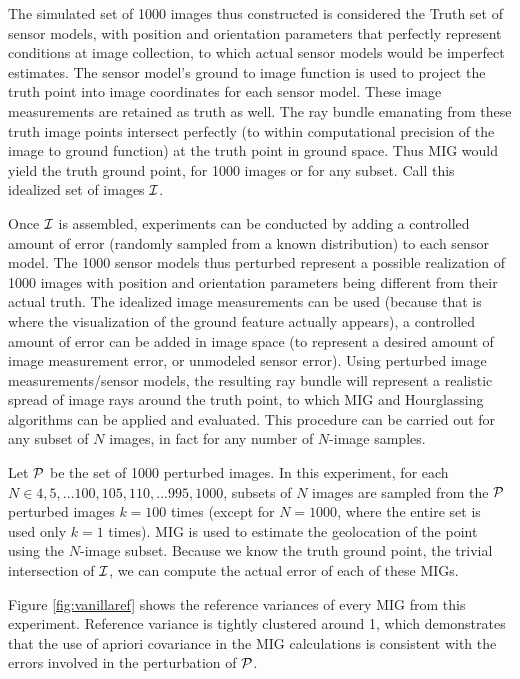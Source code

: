 \documentclass{amsart}
\begin{document}
The simulated set of 1000 images thus constructed is considered the Truth set of
sensor models, with position and orientation parameters that perfectly represent
conditions at image collection, to which actual sensor models would be imperfect
estimates. The sensor model's ground to image function is used to project the
truth point into image coordinates for each sensor model. These image
measurements are retained as truth as well. The ray bundle emanating from these
truth image points intersect perfectly (to within computational precision of the
image to ground function) at the truth point in ground space. Thus MIG would
yield the truth ground point, for 1000 images or for any subset. Call this
idealized set of images $\mathcal{I}$.

Once $\mathcal{I}$ is assembled, experiments can be conducted by adding a controlled
amount of error (randomly sampled from a known distribution) to each sensor
model. The 1000 sensor models thus perturbed represent a possible realization of
1000 images with position and orientation parameters being different from their
actual truth. The idealized image measurements can be used (because that is
where the visualization of the ground feature actually appears), a controlled
amount of error can be added in image space (to represent a desired amount of
image measurement error, or unmodeled sensor error). Using perturbed image
measurements/sensor models, the resulting ray bundle will represent a realistic
spread of image rays around the truth point, to which MIG and Hourglassing
algorithms can be applied and evaluated. This procedure can be carried out for
any subset of $N$ images, in fact for any number of $N$-image samples.

Let $\mathcal{P}$ be the set of 1000 perturbed images. In this experiment, for each
$N\in{4,5,...100,105,110,...995,1000}$, subsets of $N$ images are sampled from
the $\mathcal{P}$ perturbed images $k=100$ times (except for $N=1000$, where the
entire set is used only $k=1$ times). MIG is used to estimate the geolocation of
the point using the $N$-image subset. Because we know the truth ground point,
the trivial intersection of $\mathcal{I}$, we can compute the actual error of each of
these MIGs.

Figure \ref{fig:vanillaref} shows the reference variances of every MIG from this
experiment. Reference variance is tightly clustered around 1, which demonstrates
that the use of apriori covariance in the MIG calculations is consistent with
the errors involved in the perturbation of $\mathcal{P}$.
\end{document}
